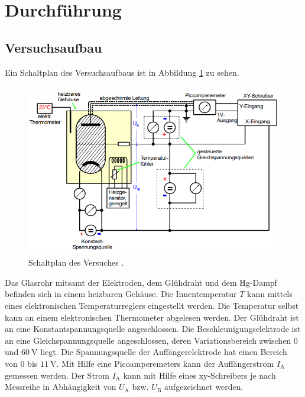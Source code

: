 \section{Durchführung}

\subsection{Versuchsaufbau}
Ein Schaltplan des Versuchsaufbaus ist in Abbildung \ref{fig:schaltung} zu sehen.
\begin{figure}[H]
    \centering
    \includegraphics[height = 7.5cm]{bilder/schaltung.png}
    \caption{Schaltplan des Versuches \cite{man:v601}.}
    \label{fig:schaltung}
\end{figure}

\noindent
Das Glasrohr mitsamt der Elektroden, dem Glühdraht und dem Hg-Dampf befinden sich in einem heizbaren Gehäuse.
Die Innentemperatur $T$ kann mittels eines elektronischen Temperaturreglers eingestellt werden.
Die Temperatur selbst kann an einem elektronischen Thermometer abgelesen werden.
Der Glühdraht ist an eine Konstantspannungsquelle angeschlossen.
Die Beschleunigungselektrode ist an eine Gleichspannungsquelle angeschlossen, deren Variationsbereich zwischen 0 und $\qty{60}{\volt}$ liegt.
Die Spannungsquelle der Auffängerelektrode hat einen Bereich von 0 bis $\qty{11}{\volt}$.
Mit Hilfe eine Picoamperemeters kann der Auffängerstrom $I_\text{A}$ gemessen werden.
Der Strom $I_\text{A}$ kann mit Hilfe eines xy-Schreibers je nach Messreihe in Abhängigkeit von $U_\text{A}$ bzw. $U_\text{B}$ aufgezeichnet werden.

